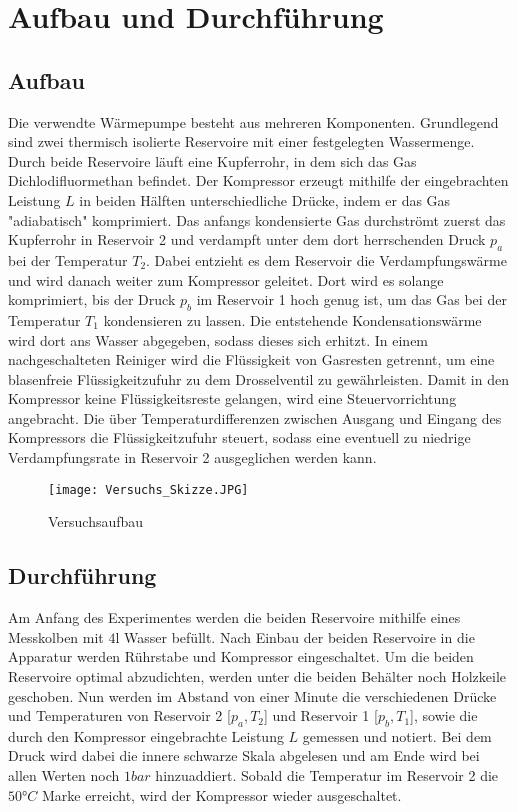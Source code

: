 \section{Aufbau und Durchführung}

\subsection{Aufbau}

Die verwendte Wärmepumpe besteht aus mehreren Komponenten. Grundlegend sind zwei thermisch isolierte Reservoire mit einer festgelegten
Wassermenge. Durch beide Reservoire läuft eine Kupferrohr, in dem sich das Gas Dichlodifluormethan befindet. Der Kompressor erzeugt
mithilfe der eingebrachten Leistung $L$ in beiden
Hälften unterschiedliche Drücke, indem er das Gas "adiabatisch" komprimiert. Das anfangs kondensierte Gas durchströmt zuerst das Kupferrohr in Reservoir 2 und
verdampft unter dem dort herrschenden Druck $p_a$ bei der Temperatur $T_2$. Dabei entzieht es dem Reservoir die Verdampfungswärme und wird danach
weiter zum Kompressor geleitet. Dort wird es solange komprimiert, bis der Druck $p_b$ im Reservoir 1 hoch genug ist, um das Gas bei der
Temperatur $T_1$ kondensieren zu lassen. Die entstehende
Kondensationswärme wird dort ans Wasser abgegeben, sodass dieses sich erhitzt. In einem nachgeschalteten Reiniger wird die Flüssigkeit
von Gasresten getrennt, um eine blasenfreie Flüssigkeitzufuhr zu dem Drosselventil zu gewährleisten. Damit in den Kompressor keine
Flüssigkeitsreste gelangen, wird eine Steuervorrichtung angebracht. Die über Temperaturdifferenzen zwischen Ausgang und Eingang
des Kompressors die Flüssigkeitzufuhr steuert, sodass eine eventuell zu niedrige Verdampfungsrate in Reservoir 2 ausgeglichen werden kann.

\begin{figure}
  \centering
  \texttt{[image: Versuchs\_Skizze.JPG]}
  \caption{Versuchsaufbau}
  \label{fig:Aufbau}
\end{figure}

\subsection{Durchführung}

Am Anfang des Experimentes werden die beiden Reservoire mithilfe eines Messkolben mit $4 \mathup{l}$ Wasser befüllt. Nach Einbau der beiden Reservoire
in die Apparatur werden Rührstabe und Kompressor eingeschaltet. Um die beiden Reservoire optimal abzudichten, werden unter die beiden Behälter
noch Holzkeile geschoben. Nun werden im Abstand von einer Minute die verschiedenen Drücke und Temperaturen
von Reservoir 2 [$p_a, T_2$] und Reservoir 1 [$p_b, T_1$], sowie die durch den Kompressor eingebrachte Leistung $L$ gemessen und notiert. Bei dem Druck
wird dabei die innere schwarze Skala abgelesen und am Ende wird bei allen Werten noch $1 bar$ hinzuaddiert. Sobald
die Temperatur im Reservoir 2 die $50 °C$ Marke erreicht, wird der Kompressor wieder ausgeschaltet.

